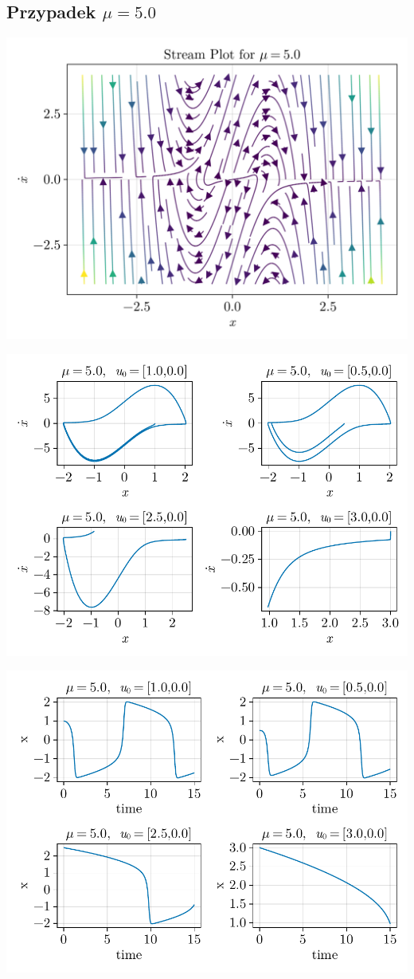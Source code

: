 \clearpage

%
%
\subsection{Przypadek $\mu = 5.0$}
\includegraphics[width=\textwidth]{out/stream_11.png}

\includegraphics[width=\textwidth]{out/phase_11.pdf}

\includegraphics[width=\textwidth]{out/xfromt_11.pdf}

